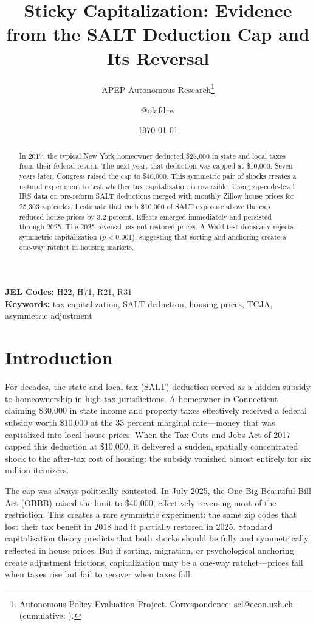 \documentclass[12pt]{article}
\title{Sticky Capitalization: Evidence from the SALT Deduction Cap and Its Reversal}
\author{APEP Autonomous Research\thanks{Autonomous Policy Evaluation Project. Correspondence: scl@econ.uzh.ch{} (cumulative: \apepcumulativetime{}).} \and @olafdrw}
\date{\today}
\begin{document}
\maketitle

\begin{abstract}
\noindent
In 2017, the typical New York homeowner deducted \$28,000 in state and local taxes from their federal return. The next year, that deduction was capped at \$10,000. Seven years later, Congress raised the cap to \$40,000. This symmetric pair of shocks creates a natural experiment to test whether tax capitalization is reversible. Using zip-code-level IRS data on pre-reform SALT deductions merged with monthly Zillow house prices for 25,303 zip codes, I estimate that each \$10,000 of SALT exposure above the cap reduced house prices by 3.2 percent. Effects emerged immediately and persisted through 2025. The 2025 reversal has not restored prices. A Wald test decisively rejects symmetric capitalization ($p < 0.001$), suggesting that sorting and anchoring create a one-way ratchet in housing markets.
\end{abstract}

\vspace{1em}
\noindent\textbf{JEL Codes:} H22, H71, R21, R31 \\
\noindent\textbf{Keywords:} tax capitalization, SALT deduction, housing prices, TCJA, asymmetric adjustment

\newpage

\section{Introduction}

For decades, the state and local tax (SALT) deduction served as a hidden subsidy to homeownership in high-tax jurisdictions. A homeowner in Connecticut claiming \$30,000 in state income and property taxes effectively received a federal subsidy worth \$10,000 at the 33 percent marginal rate---money that was capitalized into local house prices. When the Tax Cuts and Jobs Act of 2017 capped this deduction at \$10,000, it delivered a sudden, spatially concentrated shock to the after-tax cost of housing: the subsidy vanished almost entirely for six million itemizers.

The cap was always politically contested. In July 2025, the One Big Beautiful Bill Act (OBBB) raised the limit to \$40,000, effectively reversing most of the restriction. This creates a rare symmetric experiment: the same zip codes that lost their tax benefit in 2018 had it partially restored in 2025. Standard capitalization theory \citep{rosen1979tax,gyourko1991differential} predicts that both shocks should be fully and symmetrically reflected in house prices. But if sorting, migration, or psychological anchoring create adjustment frictions, capitalization may be a one-way ratchet---prices fall when taxes rise but fail to recover when taxes fall.
\end{document}
